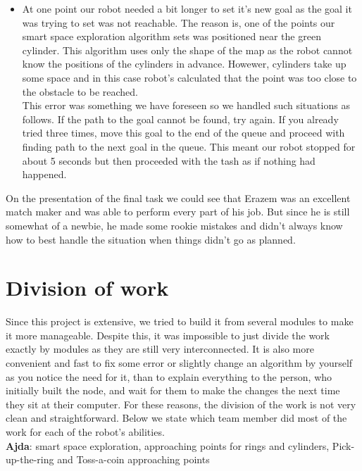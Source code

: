 \documentclass[12pt,a4paper]{article}
\begin{document}
\begin{itemize}
		\item At one point our robot needed a bit longer to set it's new goal as the goal it was trying to set was not reachable. The reason is, one of the points our smart space exploration algorithm sets was positioned near the green cylinder. This algorithm uses only the shape of the map as the robot cannot know the positions of the cylinders in advance. Howewer, cylinders take up some space and in this case robot's calculated that the point was too close to the obstacle to be reached. \\
		This error was something we have foreseen so we handled such situations as follows. If the path to the goal cannot be found, try again. If you already tried three times, move this goal to the end of the queue and proceed with finding path to the next goal in the queue. This meant our robot stopped for about 5 seconds but then proceeded with the tash as if nothing had happened.
	\end{itemize}


	On the presentation of the final task we could see that Erazem was an excellent match maker and was able to perform every part of his job. But since he is still somewhat of a newbie, he made some rookie mistakes and didn't always know how to best handle the situation when things didn't go as planned.

	\section{Division of work}
	Since this project is extensive, we tried to build it from several modules to make it more manageable. Despite this, it was impossible to just divide the work exactly by modules as they are still very interconnected. It is also more convenient and fast to fix some error or slightly change an algorithm by yourself as you notice the need for it, than to explain everything to the person, who initially built the node, and wait for them to make the changes the next time they sit at their computer. For these reasons, the division of the work is not very clean and straightforward. Below we state which team member did most of the work for each of the robot's abilities. \\

	\textbf{Ajda}: smart space exploration, approaching points for rings and cylinders, Pick-up-the-ring and Toss-a-coin approaching points
	
\end{document}
